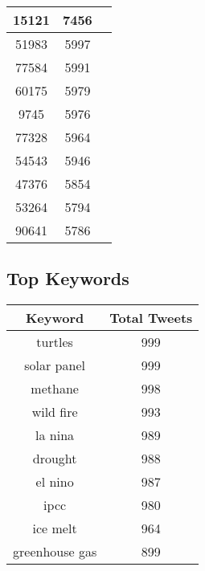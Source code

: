 \documentclass{article}\usepackage[T1]{fontenc}
\begin{document}
\begin{tabular}{|c|c|c|}
 \hline
15121 & 7456\\ 
 \hline
51983 & 5997\\ 
 \hline
77584 & 5991\\ 
 \hline
60175 & 5979\\ 
 \hline
9745 & 5976\\ 
 \hline
77328 & 5964\\ 
 \hline
54543 & 5946\\ 
 \hline
47376 & 5854\\ 
 \hline
53264 & 5794\\ 
 \hline
90641 & 5786\\ 
 \hline
\end{tabular}\subsection*{Top Keywords}\begin{tabular}{|c|c|}         \hline         Keyword & Total Tweets \\ 
 \hline
turtles & 999\\ 
 \hline
solar panel & 999\\ 
 \hline
methane & 998\\ 
 \hline
wild fire & 993\\ 
 \hline
la nina & 989\\ 
 \hline
drought & 988\\ 
 \hline
el nino & 987\\ 
 \hline
ipcc & 980\\ 
 \hline
ice melt & 964\\ 
 \hline
greenhouse gas & 899\\ 
 \hline
\end{tabular}
\end{document}
